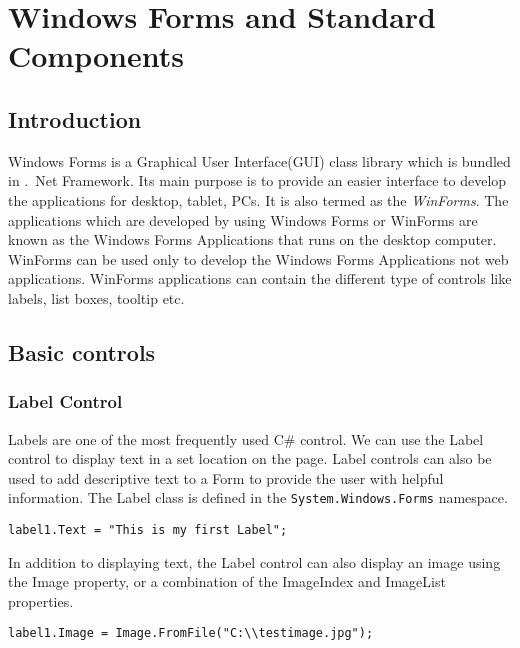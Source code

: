 \chapter{Windows Forms and Standard Components}

\section{Introduction}
Windows Forms is a Graphical User Interface(GUI) class library which is bundled in .\ Net Framework. Its main purpose is to provide an easier interface to develop the applications for desktop, tablet, PCs. It is also termed as the \textit{WinForms}. The applications which are developed by using Windows Forms or WinForms are known as the Windows Forms Applications that runs on the desktop computer. WinForms can be used only to develop the Windows Forms Applications not web applications. WinForms applications can contain the different type of controls like labels, list boxes, tooltip etc.

\section{Basic controls}
\subsection{Label Control}
Labels are one of the most frequently used C\# control. We can use the Label control to display text in a set location on the page. Label controls can also be used to add descriptive text to a Form to provide the user with helpful information. The Label class is defined in the \texttt{System.Windows.Forms} namespace.



\begin{lstlisting}[numbers=none]
label1.Text = "This is my first Label";	
\end{lstlisting}
	
In addition to displaying text, the Label control can also display an image using the Image property, or a combination of the ImageIndex and ImageList properties.

\begin{lstlisting}[numbers=none]
label1.Image = Image.FromFile("C:\\testimage.jpg");
\end{lstlisting}

